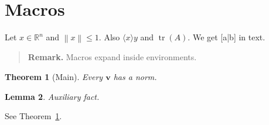 \newcommand{\R}{\mathbb{R}}
\newcommand{\norm}[1]{\left\lVert #1 \right\rVert}
\newcommand{\pair}[2][]{\langle #1 #2 \rangle}
\renewcommand{\vec}[1]{\mathbf{#1}}
\def\wrap#1#2{[#1|#2]}
\DeclareMathOperator{\tr}{tr}
\newtheorem{theorem}{Theorem}
\newtheorem{lemma}[theorem]{Lemma}
\newenvironment{remarkbox}{\begin{quote}\textbf{Remark.}}{\end{quote}}

\section{Macros}
Let $x \in \R^n$ and $\norm{x} \le 1$. Also $\pair{x}{y}$ and $\tr(A)$.
We get \wrap{a}{b} in text.
\begin{remarkbox}
Macros expand inside environments.
\end{remarkbox}
\begin{theorem}[Main]\label{thm:main}
Every $\vec{v}$ has a norm.
\end{theorem}
\begin{lemma}
Auxiliary fact.
\end{lemma}
See Theorem~\ref{thm:main}.

